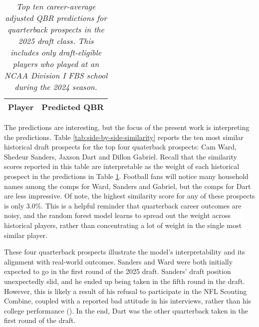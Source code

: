 \documentclass{article}
\begin{document}
\begin{table}[H]
  \centering
  \begin{tabular}{l|r}
    Player & Predicted QBR\\
    \hline
    
  \end{tabular}
  \caption{\textit{Top ten career-average adjusted QBR predictions for quarterback prospects in the 2025 draft class. This includes only draft-eligible players who played at an NCAA Division I FBS school during the 2024 season.}}
  \label{tab:top-ten}
\end{table}

The predictions are interesting, but the focus of the present work is interpreting the predictions. Table \ref{tab:side-by-side-similarity} reports the ten most similar historical draft prospects for the top four quaterback prospects: Cam Ward, Shedeur Sanders, Jaxson Dart and Dillon Gabriel. Recall that the similarity scores reported in this table are interpretable as the weight of each historical prospect in the predictions in Table \ref{tab:top-ten}. Football fans will notice many household names among the comps for Ward, Sanders and Gabriel, but the comps for Dart are less impressive. Of note, the highest similarity score for any of these prospects is only 3.0\%. This is a helpful reminder that quarterback career outcomes are noisy, and the random forest model learns to spread out the weight across historical players, rather than concentrating a lot of weight in the single most similar player.

These four quarterback prospects illustrate the model's interpretability and its alignment with real-world outcomes. Sanders and Ward were both initially expected to go in the first round of the 2025 draft. Sanders' draft position unexpectedly slid, and he ended up being taken in the fifth round in the draft. However, this is likely a result of his refusal to participate in the NFL Scouting Combine, coupled with a reported bad attitude in his interviews, rather than his college performance (\cite{mckenna_what_nodate}). In the end, Dart was the other quarterback taken in the first round of the draft.

\begin{table}[H]
  \caption{\textit{Top ten similarity scores for each of the top four quarterback prospects in the 2025 NFL draft. The similarity score is the contribution made by each historical prospect to the weighted average which constitutes the reference prospect's prediction in the random forest model.}}
  \label{tab:side-by-side-similarity}
\end{table}
\end{document}
